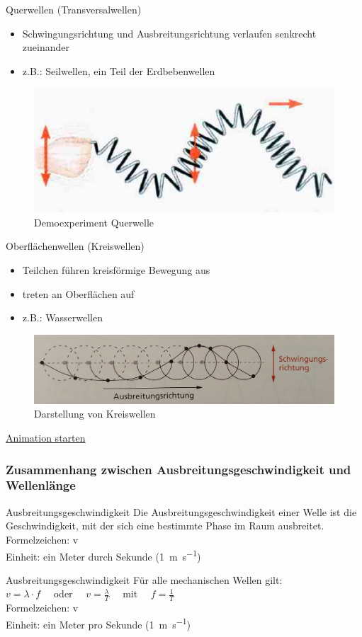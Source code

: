 \documentclass{beamer}
\begin{document}
{	\begin{block}{Querwellen (Transversalwellen)}
	\begin{itemize}
	\item Schwingungsrichtung und Ausbreitungsrichtung verlaufen senkrecht zueinander
	\item z.B.: Seilwellen, ein Teil der Erdbebenwellen
	\end{itemize}
	\end{block}
	\begin{figure}
	\includegraphics[scale=0.3]{Querwelle}
	\caption{Demoexperiment Querwelle}
	\end{figure}
	\begin{block}{Oberflächenwellen (Kreiswellen)}
	\begin{itemize}
	\item Teilchen führen kreisförmige Bewegung aus
	\item treten an Oberflächen auf
	\item z.B.: Wasserwellen
	\end{itemize}
	\end{block}
	\begin{figure}
		\includegraphics[scale=0.1]{kreiswellen.jpg}
		\caption{Darstellung von Kreiswellen}
	\end{figure}
	\href{file:///home/heikoneu/Dokumente/Gnuplot/wasser.gif}{Animation starten}
}

\frame
{
  \frametitle{Zusammenhang zwischen Ausbreitungsgeschwindigkeit und Wellenlänge}
	\begin{block}{Ausbreitungsgeschwindigkeit}
	Die Ausbreitungsgeschwindigkeit einer Welle ist die Geschwindigkeit, mit der sich eine bestimmte Phase im Raum ausbreitet.\\
	Formelzeichen: v\\
	Einheit: ein Meter durch Sekunde (\SI{1}{\meter\per\second})
	\end{block}
	\begin{block}{Ausbreitungsgeschwindigkeit}
	Für alle mechanischen Wellen gilt:\\
	$v=\lambda\cdot f\quad$ oder $\quad v=\frac{\lambda}{T}\quad$ mit $\quad f=\frac{1}{T}$\\
	Formelzeichen: v\\
	Einheit: ein Meter pro Sekunde (\SI{1}{\meter\per\second})
	\end{block}	
}
\end{document}

